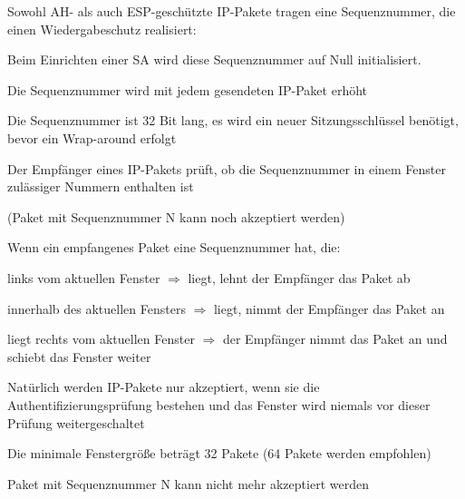 \documentclass[a4paper]{article}
\begin{document}
\begin{multicols}{3}
      \begin{itemize*}
            \item Sowohl AH- als auch ESP-geschützte IP-Pakete tragen eine
            Sequenznummer, die einen Wiedergabeschutz realisiert:
            \begin{itemize*}
                  \item Beim Einrichten einer SA wird diese Sequenznummer auf Null initialisiert.
                  \item Die Sequenznummer wird mit jedem gesendeten IP-Paket erhöht
                  \item Die Sequenznummer ist 32 Bit lang, es wird ein neuer Sitzungsschlüssel benötigt, bevor ein Wrap-around erfolgt
                  \item Der Empfänger eines IP-Pakets prüft, ob die Sequenznummer in einem Fenster zulässiger Nummern enthalten ist
                  \begin{itemize*}
                        \item (Paket mit Sequenznummer N kann noch akzeptiert werden) \end{itemize*}
            \end{itemize*}
            \item Wenn ein empfangenes Paket eine Sequenznummer hat, die:
            \begin{itemize*}
                  \item links vom aktuellen Fenster $\Rightarrow$ liegt, lehnt der Empfänger das Paket ab
                  \item innerhalb des aktuellen Fensters $\Rightarrow$ liegt, nimmt der Empfänger das Paket an
                  \item liegt rechts vom aktuellen Fenster $\Rightarrow$ der Empfänger nimmt das Paket an und schiebt das Fenster weiter
                  \item Natürlich werden IP-Pakete nur akzeptiert, wenn sie die Authentifizierungsprüfung bestehen und das Fenster wird niemals vor dieser Prüfung weitergeschaltet
            \end{itemize*}
            \item Die minimale Fenstergröße beträgt 32 Pakete (64 Pakete werden
            empfohlen)
            \begin{itemize*}
                  \item Paket mit Sequenznummer N kann nicht mehr akzeptiert werden
            \end{itemize*}
      \end{itemize*}



\end{multicols}
\end{document}
